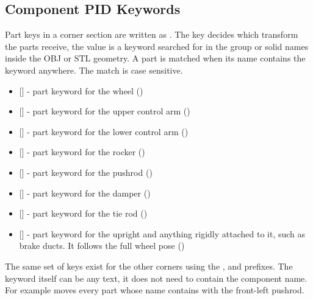 \subsection{Component PID Keywords}
Part keys in a corner section are written as . The key decides which transform the parts receive, the value is a keyword searched for in the group or solid names inside the OBJ or STL geometry. A part is matched when its name contains the keyword anywhere. The match is case sensitive.
\begin{itemize}
    \item {} [] - part keyword for the wheel ()

    \item {} [] - part keyword for the upper control arm ()

    \item {} [] - part keyword for the lower control arm ()

    \item {} [] - part keyword for the rocker ()

    \item {} [] - part keyword for the pushrod ()

    \item {} [] - part keyword for the damper ()

    \item {} [] - part keyword for the tie rod ()

    \item {} [] - part keyword for the upright and anything rigidly attached to it, such as brake ducts. It follows the full wheel pose ()
\end{itemize}
The same set of keys exist for the other corners using the ,  and  prefixes. The keyword itself can be any text, it does not need to contain the component name. For example  moves every part whose name contains  with the front-left pushrod.

